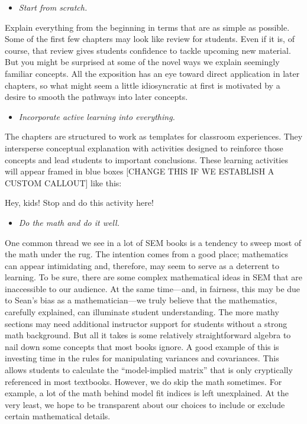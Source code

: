 \documentclass[
]{book}
\providecommand{\tightlist}{%
  \setlength{\itemsep}{0pt}\setlength{\parskip}{0pt}}
\begin{document}
\begin{itemize}
\tightlist
\item
  \emph{Start from scratch.}
\end{itemize}

Explain everything from the beginning in terms that are as simple as possible. Some of the first few chapters may look like review for students. Even if it is, of course, that review gives students confidence to tackle upcoming new material. But you might be surprised at some of the novel ways we explain seemingly familiar concepts. All the exposition has an eye toward direct application in later chapters, so what might seem a little idiosyncratic at first is motivated by a desire to smooth the pathways into later concepts.

\begin{itemize}
\tightlist
\item
  \emph{Incorporate active learning into everything.}
\end{itemize}

The chapters are structured to work as templates for classroom experiences. They intersperse conceptual explanation with activities designed to reinforce those concepts and lead students to important conclusions. These learning activities will appear framed in blue boxes {[}CHANGE THIS IF WE ESTABLISH A CUSTOM CALLOUT{]} like this:

Hey, kids! Stop and do this activity here!

\begin{itemize}
\tightlist
\item
  \emph{Do the math and do it well.}
\end{itemize}

One common thread we see in a lot of SEM books is a tendency to sweep most of the math under the rug. The intention comes from a good place; mathematics can appear intimidating and, therefore, may seem to serve as a deterrent to learning. To be sure, there are some complex mathematical ideas in SEM that are inaccessible to our audience. At the same time---and, in fairness, this may be due to Sean's bias as a mathematician---we truly believe that the mathematics, carefully explained, can illuminate student understanding. The more mathy sections may need additional instructor support for students without a strong math background. But all it takes is some relatively straightforward algebra to nail down some concepts that most books ignore. A good example of this is investing time in the rules for manipulating variances and covariances. This allows students to calculate the ``model-implied matrix'' that is only cryptically referenced in most textbooks. However, we do skip the math sometimes. For example, a lot of the math behind model fit indices is left unexplained. At the very least, we hope to be transparent about our choices to include or exclude certain mathematical details.
\end{document}
